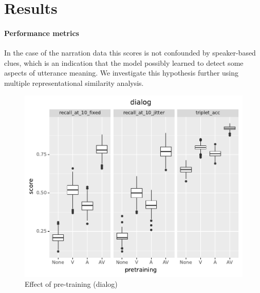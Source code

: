 \section{Results}
\label{sec:results}
\paragraph{Performance metrics}


In the case of the narration data this scores is not confounded by
speaker-based clues, which is an indication that the model possibly
learned to detect some aspects of utterance meaning. We investigate
this hypothesis further using multiple representational similarity
analysis.
 
\begin{figure}
  \centering
  \includegraphics[width=\textwidth]{results/slides/pretraining_dialog.pdf}
  \caption{Effect of pre-training (dialog)}
  \label{fig:pretraining-dialog}
\end{figure}

